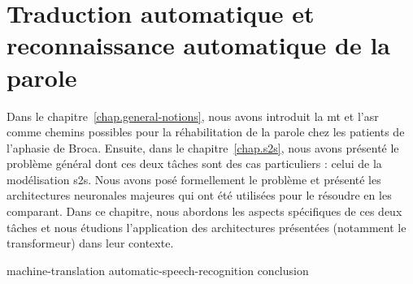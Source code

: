 \chapter{Traduction automatique et reconnaissance automatique de la parole}
\label{chap.mt-and-asr}

Dans le chapitre~\ref{chap.general-notions}, 
nous avons introduit la \gls{mt} et l'\gls{asr} comme chemins possibles 
pour la réhabilitation de la parole chez les patients de l'aphasie de Broca.
Ensuite, dans le chapitre~\ref{chap.s2s}, nous avons présenté le problème général
dont ces deux tâches sont des cas particuliers : celui de la modélisation \gls{s2s}.
Nous avons posé formellement le problème 
et présenté les architectures neuronales majeures qui ont été utilisées pour le résoudre en les comparant.
Dans ce chapitre, nous abordons les aspects spécifiques de ces deux tâches
et nous étudions l'application des architectures présentées (notamment le transformeur) dans leur contexte.

{machine-translation}
{automatic-speech-recognition}
{conclusion}